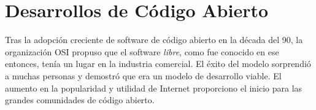 %
%
%

\section{Desarrollos de Código Abierto}

Tras la adopción creciente de software de código abierto en la década
del 90, la organización OSI propuso que el software \textit{libre},
como fue conocido en ese entonces, tenía un lugar en la industria
comercial. El éxito del modelo sorprendió a muchas personas y demostró
que era un modelo de desarrollo viable. El aumento en la popularidad y
utilidad de Internet proporciono el inicio para las grandes
comunidades de código abierto.

